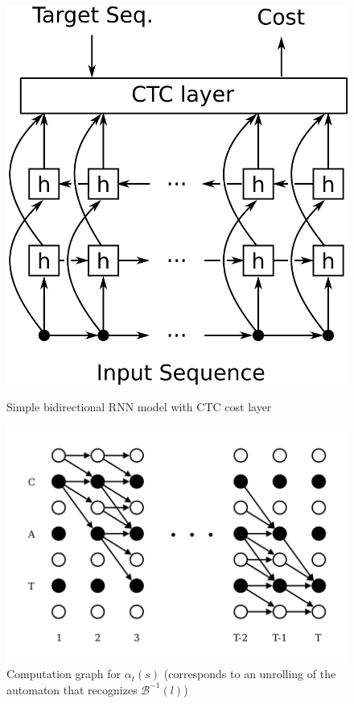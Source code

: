 \documentclass[11pt,a4paper]{article}
\begin{document}
\begin{figure}[H]
    \hfill{}
    \begin{minipage}{.4\textwidth}
        \centering
        \includegraphics[width=0.8\linewidth]{azerty4.png}
        \caption{Simple bidirectional RNN model with CTC cost layer}
        \label{Setup}
    \end{minipage}
    \hfill{}
    \begin{minipage}{.5\textwidth}
        \centering
		\vspace{1em}
        \includegraphics[width=1.0\linewidth]{azerty1.png}
        \caption{Computation graph for $\alpha_t(s)$ (corresponds to an unrolling of the automaton that recognizes $\mathcal{B}^{-1}(l)$)}
        \label{auto}
    \end{minipage}
    \hfill{}
\end{figure}
\end{document}
